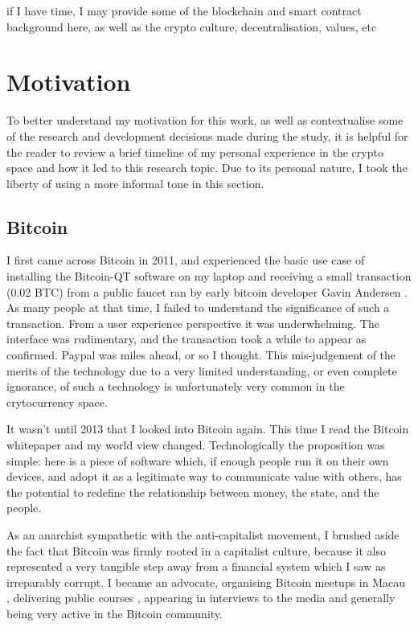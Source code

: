 \todo if I have time, I may provide some of the blockchain and smart contract background here, as well as the crypto culture, decentralisation, values, etc

\section{Motivation}

To better understand my motivation for this work, as well as contextualise some of the research and development decisions made during the study, it is helpful for the reader to review a brief timeline of my personal experience in the crypto space and how it led to this research topic. Due to its personal nature, I took the liberty of using a more informal tone in this section.

\subsection*{Bitcoin}

I first came across Bitcoin in 2011, and experienced the basic use case of installing the Bitcoin-QT software on my laptop and receiving a small transaction (0.02 BTC) from a public faucet ran by early bitcoin developer Gavin Andersen \cite{lucasHowGavinAndresen2022}. As many people at that time, I failed to understand the significance of such a transaction. From a user experience perspective it was underwhelming.  The interface was rudimentary, and the transaction took a while to appear as confirmed. Paypal was miles ahead, or so I thought. This mis-judgement of the merits of the technology due to a very limited understanding, or even complete ignorance, of such a technology is unfortunately very common in the crytocurrency space.

It wasn't until 2013 that I looked into Bitcoin again. This time I read the Bitcoin whitepaper \cite{nakamotoBitcoinPeertopeerElectronic2008} and my world view changed. Technologically the proposition was simple: here is a piece of software which, if enough people run it on their own devices, and adopt it as a legitimate way to communicate value with others, has the potential to redefine the relationship between money, the state, and the people.

As an anarchist sympathetic with the anti-capitalist movement, I brushed aside the fact that Bitcoin was firmly rooted in a capitalist culture, because it also represented a very tangible step away from a financial system which I saw as irreparably corrupt. I became an advocate, organising Bitcoin meetups in Macau \cite{BitcoinMacau2024}, delivering public courses \cite{mouraUSJHoldCourse2021}, appearing in interviews to the media \cite{tdmportuguesenewsprogramsReportagemJornalistaLina2015} \cite{reisBitcoinDuasFaces2017} and generally being very active in the Bitcoin community.

